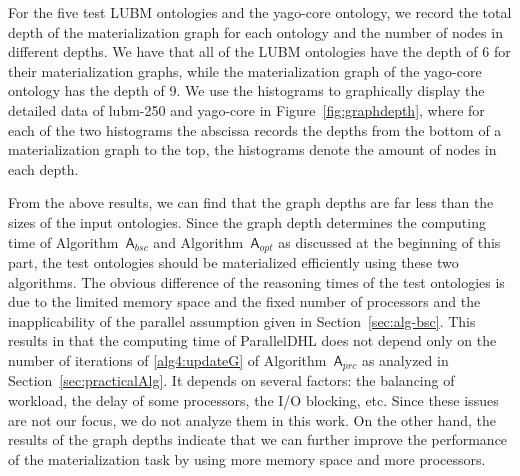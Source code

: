 For the five test LUBM ontologies and the yago-core ontology, we record the total depth
of the materialization graph for each ontology and the number of nodes in different depths.
We have that all of the LUBM ontologies have the depth of 6 for their
materialization graphs, while the materialization graph of the yago-core ontology
has the depth of 9.
We use the histograms to graphically display the detailed data of lubm-250 and yago-core in Figure~\ref{fig:graphdepth},
where for each of the two histograms
the abscissa records the depths from the bottom of a materialization graph to the top,
the histograms denote the amount of nodes in each depth.

From the above results, we can find that the graph depths are far less than
the sizes of the input ontologies. Since the graph depth determines the computing
time of Algorithm~$\mathsf{A}_{bsc}$ and Algorithm~$\mathsf{A}_{opt}$ as discussed
at the beginning of this part,
the test ontologies should be materialized efficiently using these two algorithms.
The obvious difference of the reasoning times of the test ontologies is due to the limited memory space and the fixed number
of processors and the inapplicability of the parallel assumption given in Section~\ref{sec:alg-bsc}.
This results in that the computing
time of ParallelDHL does not depend only on the number of iterations of \ref{alg4:updateG}
of Algorithm~$\mathsf{A}_{prc}$ as analyzed in Section~\ref{sec:practicalAlg}.
It depends on several factors: the balancing of workload, the delay of some processors,
the I/O blocking, etc. Since these issues are not our focus, we do not analyze them in this work.
On the other hand, the results of the graph depths
indicate that we can further improve the performance of the materialization task by using more
memory space and more processors.




